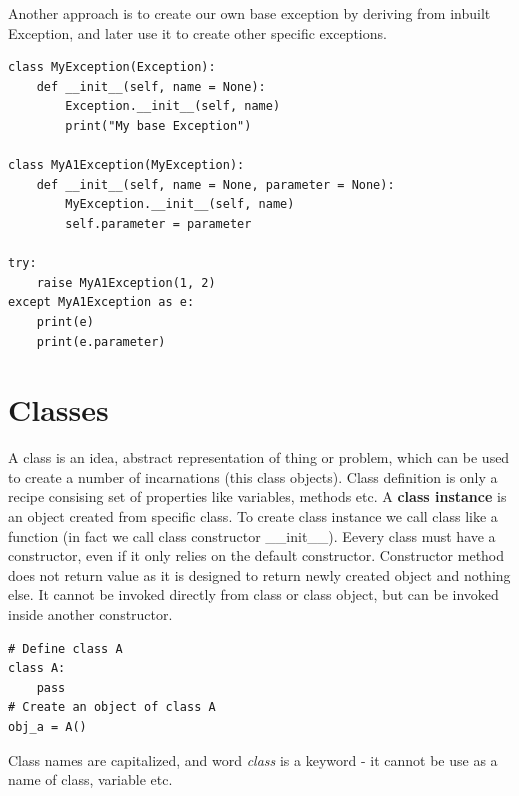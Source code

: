 \documentclass{article}
\begin{document}
Another approach is to create our own base exception by deriving from inbuilt Exception, and later use it to create other specific exceptions.
\begin{lstlisting}[style=pystyle]
class MyException(Exception):
    def __init__(self, name = None):
    	Exception.__init__(self, name)
    	print("My base Exception")

class MyA1Exception(MyException):
	def __init__(self, name = None, parameter = None):
		MyException.__init__(self, name)
		self.parameter = parameter

try:
	raise MyA1Exception(1, 2)
except MyA1Exception as e:
	print(e)
	print(e.parameter)
\end{lstlisting}


\newpage
\section{Classes}
A class is an idea, abstract representation of thing or problem, which can be used to create a number of incarnations (this class objects).
Class definition is only a recipe consising set of properties like variables, methods etc. A \textbf{class instance} is an object created from specific class. To create class instance we call class like a function (in fact we call class constructor \_\_init\_\_). Eevery class must have a constructor, even if it only relies on the default constructor. Constructor method does not return value as it is designed to return newly created object and nothing else. It cannot be invoked directly from class or class object, but can be invoked inside another constructor.
\begin{lstlisting}[style=pystyle]
# Define class A
class A:
	pass
# Create an object of class A
obj_a = A()
\end{lstlisting}
Class names are capitalized, and word \textit{class} is a keyword - it cannot be use as a name of class, variable etc.
\end{document}
